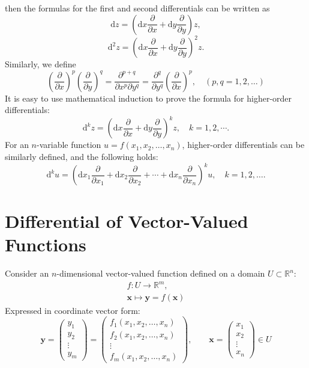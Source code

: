 \documentclass[11pt]{../../TexTemplate/elegantbook}
\begin{document}
then the formulas for the first and second differentials can be written as
\[
    \mathrm{d}z = \left( \mathrm{d}x \frac{\partial}{\partial x} + \mathrm{d}y \frac{\partial}{\partial y} \right) z,
\]
\[
    \mathrm{d}^2 z = \left( \mathrm{d}x \frac{\partial}{\partial x} + \mathrm{d}y \frac{\partial}{\partial y} \right)^2 z.
\]
Similarly, we define
\[
    \left( \frac{\partial}{\partial x} \right)^p
    \left( \frac{\partial}{\partial y} \right)^q
    = \frac{\partial^{p+q}}{\partial x^p \partial y^q}
    = \frac{\partial^q}{\partial y^q}
    \left( \frac{\partial}{\partial x} \right)^p,
    \quad (p, q = 1, 2, \dots)
\]
It is easy to use mathematical induction to prove the formula for higher-order differentials:
\[
    \mathrm{d}^k z = \left( \mathrm{d}x \frac{\partial}{\partial x} + \mathrm{d}y \frac{\partial}{\partial y} \right)^k z, 
    \quad k = 1, 2, \cdots.
\]
For an \( n \)-variable function \( u = f(x_1, x_2, \dots, x_n) \), higher-order differentials can be similarly defined, and the following holds:
\[
    \mathrm{d}^k u 
    = \left( \mathrm{d}x_1 \frac{\partial}{\partial x_1} + \mathrm{d}x_2 \frac{\partial}{\partial x_2} 
    + \cdots + \mathrm{d}x_n \frac{\partial}{\partial x_n} \right)^k u, \quad k = 1, 2, \dots.
\]



\section{Differential of Vector-Valued Functions}
Consider an $n$-dimensional vector-valued function defined on a domain $U \subset \mathbb{R}^n$:
\begin{gather*}
    f: U \to \mathbb{R}^m, \\ 
    \mathbf{x} \mapsto \mathbf{y} = f(\mathbf{x})
\end{gather*}
Expressed in coordinate vector form:
\[
    \mathbf{y} =
    \begin{pmatrix}
    y_1 \\ y_2 \\ \vdots \\ y_m
    \end{pmatrix}
    =
    \begin{pmatrix}
    f_1(x_1, x_2, \dots, x_n) \\
    f_2(x_1, x_2, \dots, x_n) \\
    \vdots \\
    f_m(x_1, x_2, \dots, x_n)
    \end{pmatrix},
    \qquad \mathbf{x} = \begin{pmatrix} 
    x_1 \\ x_2 \\ \vdots \\ x_n 
    \end{pmatrix}  \in U
\]
\end{document}
